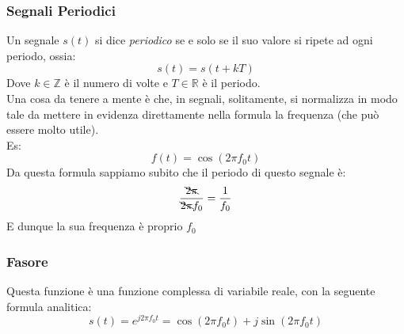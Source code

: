 \subsubsection{Segnali Periodici}
Un segnale $s(t)$ si dice \textit{periodico} se e solo se il suo valore si ripete ad ogni periodo, ossia:
\begin{equation}
    s(t) = s(t + kT)
\end{equation}
Dove $k \in \mathbb{Z}$ è il numero di volte e $T \in \mathbb{R}$ è il periodo.\\
Una cosa da tenere a mente è che, in segnali, solitamente, si normalizza in modo tale da mettere in evidenza
direttamente nella formula la frequenza (che può essere molto utile).\\
Es:
\begin{equation*}
    f(t) = \cos(2\pi f_0 t)
\end{equation*}
Da questa formula sappiamo subito che il periodo di questo segnale è:
\begin{equation*}
    \frac{\bcancel{2\pi}}{\bcancel{2\pi} f_0} = \frac{1}{f_0}
\end{equation*}
E dunque la sua frequenza è proprio $f_0$

\subsubsection{Fasore} \label{eq: fasore}
Questa funzione è una funzione complessa di variabile reale, con la seguente formula analitica:
\begin{equation}
    s(t) = e^{j2\pi f_0 t} = \cos(2\pi f_0 t) + j \sin(2\pi f_0 t)
\end{equation} 

